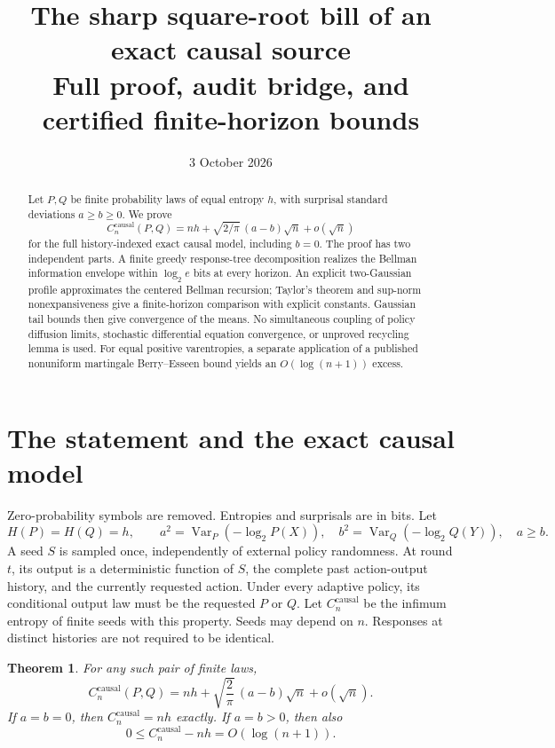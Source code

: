\documentclass[11pt,a4paper]{article}
\title{The sharp square-root bill of an exact causal source\\[4pt]
\large Full proof, audit bridge, and certified finite-horizon bounds}
\author{}
\date{3 October 2026}
\newtheorem{theorem}{Theorem}
\newcommand{\causal}{\mathrm{causal}}
\begin{document}
\maketitle
\begin{abstract}
Let $P,Q$ be finite probability laws of equal entropy $h$, with
surprisal standard deviations $a\ge b\ge0$. We prove
\[
C_n^{\causal}(P,Q)=nh+\sqrt{2/\pi}\,(a-b)\sqrt n+o(\sqrt n)
\]
for the full history-indexed exact causal model, including $b=0$.
The proof has two independent parts. A finite greedy response-tree
decomposition realizes the Bellman information envelope within
$\log_2 e$ bits at every horizon. An explicit two-Gaussian profile
approximates the centered Bellman recursion; Taylor's theorem and
sup-norm nonexpansiveness give a finite-horizon comparison with explicit
constants. Gaussian tail bounds then give convergence of the means.
No simultaneous coupling of policy diffusion limits, stochastic
differential equation convergence, or unproved recycling lemma is used.
For equal positive varentropies, a separate application of a published
nonuniform martingale Berry--Esseen bound yields an $O(\log(n+1))$ excess.
\end{abstract}

\section{The statement and the exact causal model}
Zero-probability symbols are removed. Entropies and surprisals are in
bits. Let
\[
H(P)=H(Q)=h,\qquad
a^2=\operatorname{Var}_P(-\log_2P(X)),\quad
b^2=\operatorname{Var}_Q(-\log_2Q(Y)),\quad a\ge b.
\]
A seed $S$ is sampled once, independently of external policy randomness.
At round $t$, its output is a deterministic function of $S$, the complete
past action-output history, and the currently requested action. Under
every adaptive policy, its conditional output law must be the requested
$P$ or $Q$. Let $C_n^{\causal}$ be the infimum entropy of finite seeds
with this property. Seeds may depend on $n$. Responses at distinct
histories are not required to be identical.

\begin{theorem}\label{thm:main}
For any such pair of finite laws,
\begin{equation}\label{eq:main}
\boxed{C_n^{\causal}(P,Q)
=nh+\sqrt{\frac2\pi}\,(a-b)\sqrt n+o(\sqrt n).}
\end{equation}
If $a=b=0$, then $C_n^{\causal}=nh$ exactly. If $a=b>0$, then also
\begin{equation}\label{eq:equalvar}
0\le C_n^{\causal}-nh=O(\log(n+1)).
\end{equation}
\end{theorem}
\end{document}
